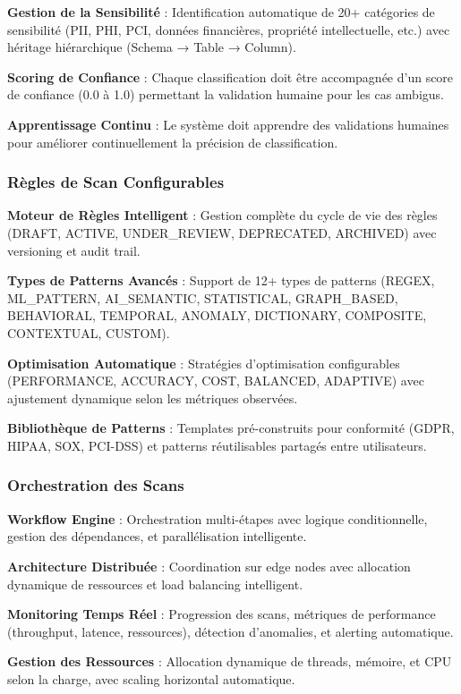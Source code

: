 \textbf{Gestion de la Sensibilité} : Identification automatique de 20+ catégories de sensibilité (PII, PHI, PCI, données financières, propriété intellectuelle, etc.) avec héritage hiérarchique (Schema → Table → Column).

\textbf{Scoring de Confiance} : Chaque classification doit être accompagnée d'un score de confiance (0.0 à 1.0) permettant la validation humaine pour les cas ambigus.

\textbf{Apprentissage Continu} : Le système doit apprendre des validations humaines pour améliorer continuellement la précision de classification.

\subsubsection{Règles de Scan Configurables}

\textbf{Moteur de Règles Intelligent} : Gestion complète du cycle de vie des règles (DRAFT, ACTIVE, UNDER\_REVIEW, DEPRECATED, ARCHIVED) avec versioning et audit trail.

\textbf{Types de Patterns Avancés} : Support de 12+ types de patterns (REGEX, ML\_PATTERN, AI\_SEMANTIC, STATISTICAL, GRAPH\_BASED, BEHAVIORAL, TEMPORAL, ANOMALY, DICTIONARY, COMPOSITE, CONTEXTUAL, CUSTOM).

\textbf{Optimisation Automatique} : Stratégies d'optimisation configurables (PERFORMANCE, ACCURACY, COST, BALANCED, ADAPTIVE) avec ajustement dynamique selon les métriques observées.

\textbf{Bibliothèque de Patterns} : Templates pré-construits pour conformité (GDPR, HIPAA, SOX, PCI-DSS) et patterns réutilisables partagés entre utilisateurs.

\subsubsection{Orchestration des Scans}

\textbf{Workflow Engine} : Orchestration multi-étapes avec logique conditionnelle, gestion des dépendances, et parallélisation intelligente.

\textbf{Architecture Distribuée} : Coordination sur edge nodes avec allocation dynamique de ressources et load balancing intelligent.

\textbf{Monitoring Temps Réel} : Progression des scans, métriques de performance (throughput, latence, ressources), détection d'anomalies, et alerting automatique.

\textbf{Gestion des Ressources} : Allocation dynamique de threads, mémoire, et CPU selon la charge, avec scaling horizontal automatique.

